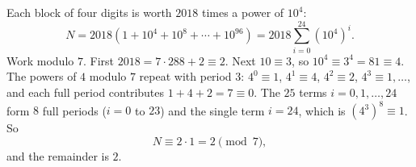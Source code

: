 Each block of four digits is worth $2018$ times a power of $10^4$:
\[
N=2018\left(1+10^4+10^8+\cdots+10^{96}\right)=2018\sum_{i=0}^{24}\left(10^4\right)^i .
\]
Work modulo $7$. First $2018=7\cdot288+2\equiv2$. Next $10\equiv3$, so $10^4\equiv3^4=81\equiv4$. The powers of $4$ modulo $7$ repeat with period $3$: $4^0\equiv1$, $4^1\equiv4$, $4^2\equiv2$, $4^3\equiv1,\dots$, and each full period contributes $1+4+2=7\equiv0$. The $25$ terms $i=0,1,\dots,24$ form $8$ full periods ($i=0$ to $23$) and the single term $i=24$, which is $\left(4^3\right)^8\equiv1$. So
\[
N\equiv2\cdot1=2\pmod 7,
\]
and the remainder is $\boxed{2}$.
